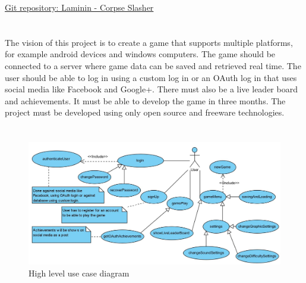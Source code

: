 \documentclass[letterpaper]{article}
\begin{document}
	\newpage
		\renewcommand\contentsname{TABLE OF CONTENTS}
		\newcommand\contentsnameLC{\colorbox{blue}{\makebox[\textwidth-2\fboxsep][l]{\bfseries\color{white} Table of Contents}}}
		
		\renewcommand{\cftdot}{}
		\hypersetup{linktocpage}
		\tableofcontents
		
		\begin{flushleft}
			\LARGE\href{https://github.com/njTaljaard/Laminin_CorpseSlasher/}{Git repository: Laminin - Corpse Slasher}
		\end{flushleft}
		
	\newpage
	
		\section*{\colorbox{blue}{}} 
		\vspace{0.2in}
		
		The vision of this project is to create a game that supports multiple platforms, for example android devices and windows computers. The game should be connected to a server where game data can be saved and retrieved real time. The user should be able to log in using a custom log in or an OAuth log in that uses social media like Facebook and Google+. There must also be a live leader board and achievements. It must be able to develop the game in three months. The project must be developed using only open source and freeware technologies.
					
		\section*{\colorbox{blue}{}} 
		
		\vspace{0.2in}
		
		\begin{figure}[ht!]
		\centering
		\includegraphics[width=180mm]{high_level_use_case_diagram}
		\caption{High level use case diagram}
		\label{overflow}
		\end{figure}
		
\end{document}

